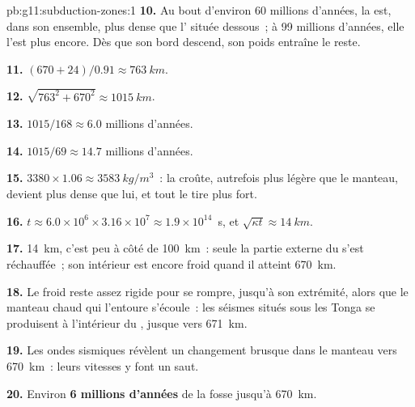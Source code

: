 \begin{solution}{pb:g11:subduction-zones:1}
\textbf{10.} Au bout d'environ 60 millions d'années, la  est, dans son ensemble, plus dense que l' située
dessous~; à 99 millions d'années, elle l'est plus encore. Dès que son bord
descend, son poids entraîne le reste.

\textbf{11.} $(670 + 24)/0.91 \approx \qty{763}{km}$.

\textbf{12.} $\sqrt{763^2 + 670^2} \approx \qty{1015}{km}$.

\textbf{13.} $1015/168 \approx 6.0$ millions d'années.

\textbf{14.} $1015/69 \approx 14.7$ millions d'années.

\textbf{15.} $3380 \times 1.06 \approx \qty{3583}{kg/m^3}$~: la croûte,
autrefois plus légère que le manteau, devient plus dense que lui, et tout le
 tire plus fort.

\textbf{16.} $t \approx 6.0 \times 10^6 \times 3.16 \times 10^7 \approx
1.9 \times 10^{14}$~s, et $\sqrt{\kappa t} \approx \qty{14}{km}$.

\textbf{17.} \qty{14}{km}, c'est peu à côté de \qty{100}{km}~: seule la
partie externe du  s'est réchauffée~; son intérieur est
encore froid quand il atteint \qty{670}{km}.

\textbf{18.} Le  froid reste assez rigide pour se rompre,
jusqu'à son extrémité, alors que le manteau chaud qui l'entoure s'écoule~:
les séismes situés sous les Tonga se produisent à l'intérieur du , jusque vers \qty{671}{km}.

\textbf{19.} Les ondes sismiques révèlent un changement brusque dans le
manteau vers \qty{670}{km}~: leurs vitesses y font un saut.

\textbf{20.} Environ \textbf{6 millions d'années} de la fosse jusqu'à
\qty{670}{km}.
\end{solution}
